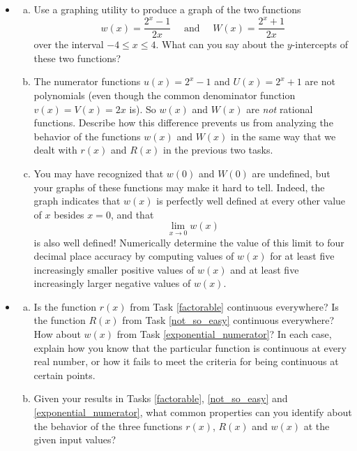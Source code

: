 \message{ !name(LHopitalsRule_2021.03.29.tex)}\documentclass[11pt]{article}
\newcounter{tasknumb}
\newcommand{\tasknumb}[1]{\refstepcounter{tasknumb}\textmd{\textbf{$\fbox{$\fbox{Task \thetasknumb}$}$}}#1}
\newenvironment{task}[1][]%
 {\begin{itemize}
 \item[\tasknumb{#1}] }
{
    \end{itemize}    }%
\begin{document}
\bigskip
\begin{task}[\label{exponential_numerator}]
\begin{enumerate}[(a)] \itemsep -8pt
\item Use a graphing utility to produce a graph of the two functions $$w(x)=\frac{2^x-1}{2x}\quad\textrm{ and }\quad W(x)=\frac{2^x+1}{2x}$$over the interval $-4 \le x \le 4$. What can you say about the $y$-intercepts of these two functions? \\
\item The numerator functions $u(x)=2^x-1$ and $U(x)=2^x+1$ are not polynomials (even though the common denominator function $v(x)=V(x)=2x$ is). So $w(x)$ and $W(x)$ are \emph{not} rational functions. Describe how this difference prevents us from analyzing the behavior of the functions $w(x)$ and $W(x)$ in the same way that we dealt with $r(x)$ and $R(x)$ in the previous two tasks. \\
\item You may have recognized that $w(0)$ and $W(0)$ are undefined, but your graphs of these functions may make it hard to tell. Indeed, the graph indicates that $w(x)$ is perfectly well defined at every other value of $x$ besides $x=0$, and that $$\lim_{x\rightarrow 0} w(x)$$ is also well defined! Numerically determine the value of this limit to four decimal place accuracy by computing values of $w(x)$ for at least five increasingly smaller positive values of $w(x)$ and at least five increasingly larger negative values of $w(x)$.
\end{enumerate}
\end{task}

\newpage
\begin{task}[\label{continuity}]
\begin{enumerate}[(a)] \itemsep -8pt
\item Is the function $r(x)$ from Task \ref{factorable} continuous everywhere? Is the function $R(x)$ from Task \ref{not_so_easy} continuous everywhere? How about $w(x)$ from Task \ref{exponential_numerator}? In each case, explain how you know that the particular function is continuous at every real number, or how it fails to meet the criteria for being continuous at certain points. \\
\item Given your results in Tasks \ref{factorable}, \ref{not_so_easy} and \ref{exponential_numerator}, what common properties can you identify about the behavior of the three functions $r(x)$, $R(x)$ and $w(x)$ at the given input values?
\end{enumerate}
\end{task}
\end{document}
